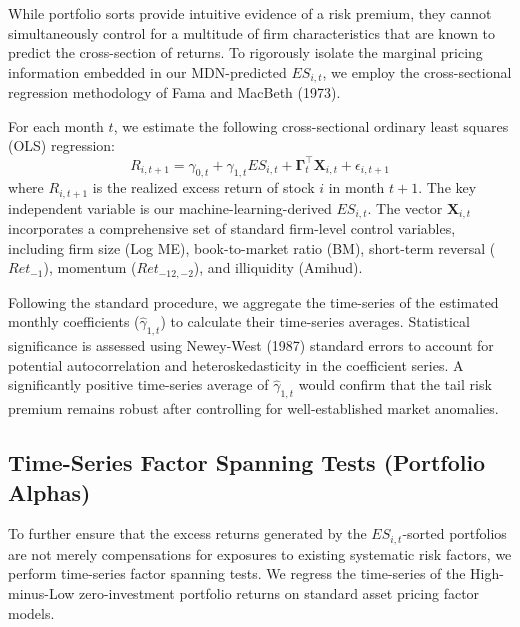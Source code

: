 \documentclass[12pt]{article}
\begin{document}
While portfolio sorts provide intuitive evidence of a risk premium, they cannot simultaneously control for a multitude of firm characteristics that are known to predict the cross-section of returns. To rigorously isolate the marginal pricing information embedded in our MDN-predicted $ES_{i,t}$, we employ the cross-sectional regression methodology of Fama and MacBeth (1973). 

For each month $t$, we estimate the following cross-sectional ordinary least squares (OLS) regression:
\begin{equation}
    R_{i,t+1} = \gamma_{0,t} + \gamma_{1,t} ES_{i,t} + \boldsymbol{\Gamma}_t^{\top} \mathbf{X}_{i,t} + \epsilon_{i,t+1}
\end{equation}
where $R_{i,t+1}$ is the realized excess return of stock $i$ in month $t+1$. The key independent variable is our machine-learning-derived $ES_{i,t}$. The vector $\mathbf{X}_{i,t}$ incorporates a comprehensive set of standard firm-level control variables, including firm size (Log ME), book-to-market ratio (BM), short-term reversal ($Ret_{-1}$), momentum ($Ret_{-12,-2}$), and illiquidity (Amihud).

Following the standard procedure, we aggregate the time-series of the estimated monthly coefficients ($\hat{\gamma}_{1,t}$) to calculate their time-series averages. Statistical significance is assessed using Newey-West (1987) standard errors to account for potential autocorrelation and heteroskedasticity in the coefficient series. A significantly positive time-series average of $\hat{\gamma}_{1,t}$ would confirm that the tail risk premium remains robust after controlling for well-established market anomalies.

\subsection{Time-Series Factor Spanning Tests (Portfolio Alphas)}
\label{subsec:spanning_tests}

To further ensure that the excess returns generated by the $ES_{i,t}$-sorted portfolios are not merely compensations for exposures to existing systematic risk factors, we perform time-series factor spanning tests. We regress the time-series of the High-minus-Low zero-investment portfolio returns on standard asset pricing factor models.
\end{document}
